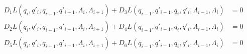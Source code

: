 \begin{equation} 
\begin{split}
    D_1 L \left( q_i,q'_i,q_{i+1},q'_{i+1},\Lambda_{i},\Lambda_{i+1} \right) + D_3 L \left( q_{i-1},q'_{i-1},q_i,q'_i,\Lambda_{i-1}, \Lambda_{i} \right) &= 0 \\
    D_2 L \left( q_i,q'_i,q_{i+1},q'_{i+1},\Lambda_{i},\Lambda_{i+1} \right) + D_4 L \left( q_{i-1},q'_{i-1},q_i,q'_i,\Lambda_{i-1},\Lambda_{i} \right) &= 0 \\
    D_5 L \left( q_i,q'_i,q_{i+1},q'_{i+1},\Lambda_{i},\Lambda_{i+1} \right) + D_6 L \left( q_{i-1},q'_{i-1},q_i,q'_i,\Lambda_{i-1},\Lambda_{i} \right) &= 0
\end{split}
\end{equation}